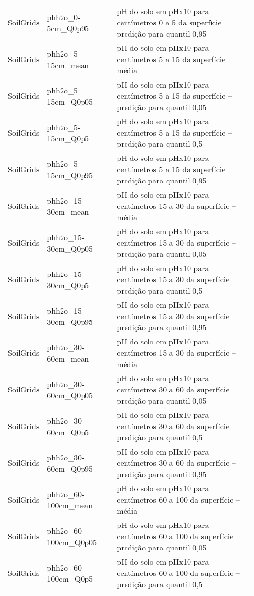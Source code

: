 \begin{longtable}{@{} p{4cm} p{4cm} p{8cm} @{}}
	SoilGrids &
	phh2o\_0-5cm\_Q0p95 &
	pH do solo em pHx10 para centímetros 0 a 5 da superfície – predição para quantil 0,95 \\
	SoilGrids &
	phh2o\_5-15cm\_mean &
	pH do solo em pHx10 para centímetros 5 a 15 da superfície – média \\
	SoilGrids &
	phh2o\_5-15cm\_Q0p05 &
	pH do solo em pHx10 para centímetros 5 a 15 da superfície – predição para quantil 0,05 \\
	SoilGrids &
	phh2o\_5-15cm\_Q0p5 &
	pH do solo em pHx10 para centímetros 5 a 15 da superfície – predição para quantil 0,5 \\
	SoilGrids &
	phh2o\_5-15cm\_Q0p95 &
	pH do solo em pHx10 para centímetros 5 a 15 da superfície – predição para quantil 0,95 \\
	SoilGrids &
	phh2o\_15-30cm\_mean &
	pH do solo em pHx10 para centímetros 15 a 30 da superfície – média \\
	SoilGrids &
	phh2o\_15-30cm\_Q0p05 &
	pH do solo em pHx10 para centímetros 15 a 30 da superfície – predição para quantil 0,05 \\
	SoilGrids &
	phh2o\_15-30cm\_Q0p5 &
	pH do solo em pHx10 para centímetros 15 a 30 da superfície – predição para quantil 0,5 \\
	SoilGrids &
	phh2o\_15-30cm\_Q0p95 &
	pH do solo em pHx10 para centímetros 15 a 30 da superfície – predição para quantil 0,95 \\
	SoilGrids &
	phh2o\_30-60cm\_mean &
	pH do solo em pHx10 para centímetros 15 a 30 da superfície – média \\
	SoilGrids &
	phh2o\_30-60cm\_Q0p05 &
	pH do solo em pHx10 para centímetros 30 a 60 da superfície – predição para quantil 0,05 \\
	SoilGrids &
	phh2o\_30-60cm\_Q0p5 &
	pH do solo em pHx10 para centímetros 30 a 60 da superfície – predição para quantil 0,5 \\
	SoilGrids &
	phh2o\_30-60cm\_Q0p95 &
	pH do solo em pHx10 para centímetros 30 a 60 da superfície – predição para quantil 0,95 \\
	SoilGrids &
	phh2o\_60-100cm\_mean &
	pH do solo em pHx10 para centímetros 60 a 100 da superfície – média \\
	SoilGrids &
	phh2o\_60-100cm\_Q0p05 &
	pH do solo em pHx10 para centímetros 60 a 100 da superfície – predição para quantil 0,05 \\
	SoilGrids &
	phh2o\_60-100cm\_Q0p5 &
	pH do solo em pHx10 para centímetros 60 a 100 da superfície – predição para quantil 0,5 \\

\end{longtable}

